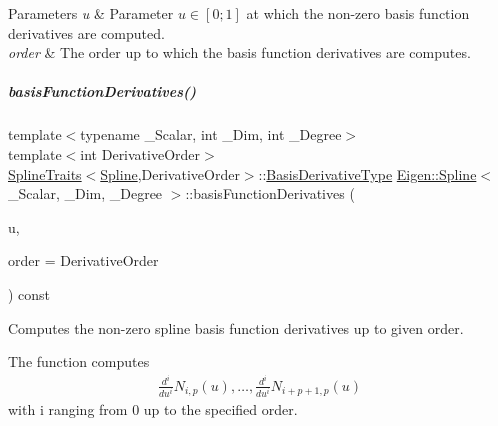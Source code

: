 \begin{DoxyParams}{Parameters}
{\em u} & Parameter $u \in [0;1]$ at which the non-\/zero basis function derivatives are computed. \\
\hline
{\em order} & The order up to which the basis function derivatives are computes. \\
\hline
\end{DoxyParams}
\mbox{\label{group___splines___module_acd36d8b5a4f57eb1d7f27989ac6d54ac}} 
\subparagraph{\texorpdfstring{basis\+Function\+Derivatives()}{basisFunctionDerivatives()}\hspace{0.1cm}{\footnotesize\ttfamily [3/4]}}
{\footnotesize\ttfamily template$<$typename \+\_\+\+Scalar, int \+\_\+\+Dim, int \+\_\+\+Degree$>$ \\
template$<$int Derivative\+Order$>$ \\
\hyperlink{struct_eigen_1_1_spline_traits}{Spline\+Traits}$<$\hyperlink{group___splines___module_class_eigen_1_1_spline}{Spline},Derivative\+Order$>$\+::\hyperlink{group___splines___module_a9db0b0108353660cd03524f2e67d6b3c}{Basis\+Derivative\+Type} \hyperlink{group___splines___module_class_eigen_1_1_spline}{Eigen\+::\+Spline}$<$ \+\_\+\+Scalar, \+\_\+\+Dim, \+\_\+\+Degree $>$\+::basis\+Function\+Derivatives (\begin{DoxyParamCaption}\item[{\hyperlink{group___splines___module_a8cafd78b564825c76fbb3419653d9742}{Scalar}}]{u,  }\item[{Dense\+Index}]{order = {\ttfamily DerivativeOrder} }\end{DoxyParamCaption}) const}



Computes the non-\/zero spline basis function derivatives up to given order. 

The function computes \begin{align*} \frac{d^i}{du^i} N_{i,p}(u), \hdots, \frac{d^i}{du^i} N_{i+p+1,p}(u) \end{align*} with i ranging from 0 up to the specified order.


